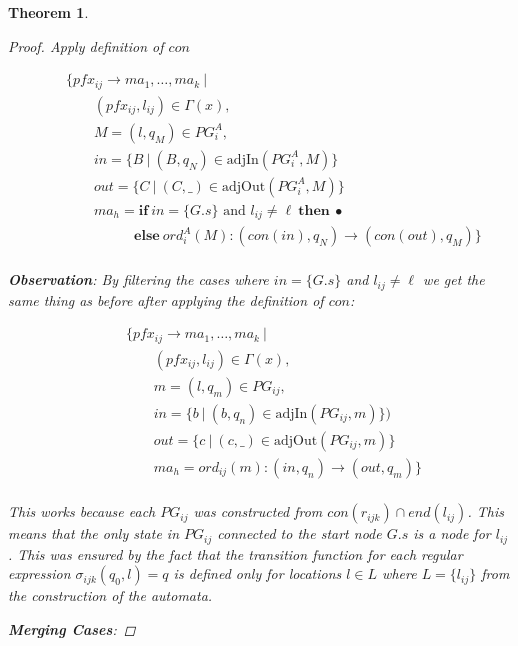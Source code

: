 \documentclass[twocolumn]{sig-alternate-10pt}
\newtheorem{thm}{Theorem}[section]
\begin{document}
\begin{thm}
\begin{proof}
  Apply definition of $con$

  \[ \begin{array}{l}
     ~~~~~~~~~ \{ pfx_{ij} \rightarrow ma_1, \dots, ma_k ~\vert~ \\
     ~~~~~~~~~~~~~~~~~~ (pfx_{ij}, l_{ij}) \in \Gamma(x), \\
     ~~~~~~~~~~~~~~~~~~ M = (l,q_M) \in PG^A_i, \\
     ~~~~~~~~~~~~~~~~~~ in = \{ B ~\vert~ (B,q_N) \in \text{adjIn}(PG^A_i,M) \} \\
     ~~~~~~~~~~~~~~~~~~ out = \{ C ~\vert~ (C,\_) \in \text{adjOut}(PG^A_i,M) \} \\
     ~~~~~~~~~~~~~~~~~~ ma_h = \textbf{if}~ in=\{ G.s \} \text{ and } l_{ij} \neq \ell ~\textbf{then}~ \bullet \\ 
     ~~~~~~~~~~~~~~~~~~~~~~~~~~~~~~~ \textbf{else}~ ord^A_i(M) : (con(in),q_N) \rightarrow (con(out),q_M) \} \\
  \end{array} \]%

  \textbf{Observation}: 
  By filtering the cases where $in = \{ G.s \}$ and $l_{ij} \neq \ell$ we get the same thing as before after applying the definition of $con$:

 \[ \begin{array}{l}
     ~~~~~~~~~ \{ pfx_{ij} \rightarrow ma_1, \dots, ma_k ~\vert~ \\
     ~~~~~~~~~~~~~~~~~~ (pfx_{ij}, l_{ij}) \in \Gamma(x), \\
     ~~~~~~~~~~~~~~~~~~ m = (l,q_m) \in PG_{ij}, \\
     ~~~~~~~~~~~~~~~~~~ in = \{ b ~\vert~ (b,q_n) \in \text{adjIn}(PG_{ij},m) \}) \\
     ~~~~~~~~~~~~~~~~~~ out = \{ c ~\vert~ (c,\_) \in \text{adjOut}(PG_{ij},m) \} \\
     ~~~~~~~~~~~~~~~~~~ ma_h = ord_{ij}(m) : (in,q_n) \rightarrow (out,q_m) \} \\
  \end{array} \]%

  This works because each $PG_{ij}$ was constructed from $con(r_{ijk}) \cap end(l_{ij})$. This means that the only state in $PG_{ij}$ connected to the start node $G.s$ is a node for $l_{ij}$. This was ensured by the fact that the transition function for each regular expression $\sigma_{ijk}(q_0,l) = q$ is defined only for locations $l \in L$ where $L = \{ l_{ij} \}$ from the construction of the automata.

  \vspace{1em}
  \textbf{Merging Cases}:


\end{proof}
\end{thm}
\end{document}
